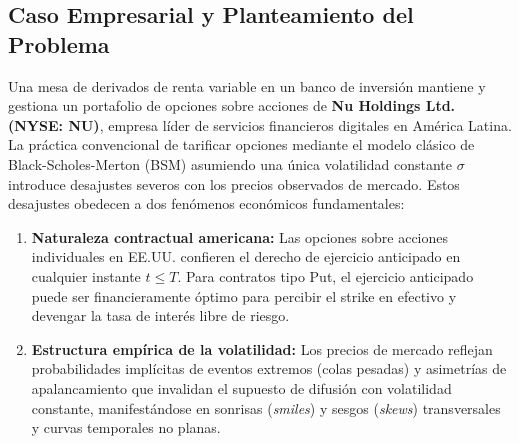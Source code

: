 \documentclass[11pt,a4paper]{article}
\begin{document}
\subsection{Caso Empresarial y Planteamiento del Problema}
Una mesa de derivados de renta variable en un banco de inversión mantiene y gestiona un portafolio de opciones sobre acciones de \textbf{Nu Holdings Ltd. (NYSE: NU)}, empresa líder de servicios financieros digitales en América Latina. La práctica convencional de tarificar opciones mediante el modelo clásico de Black-Scholes-Merton (BSM) asumiendo una única volatilidad constante $\sigma$ introduce desajustes severos con los precios observados de mercado. Estos desajustes obedecen a dos fenómenos económicos fundamentales:
\begin{enumerate}
    \item \textbf{Naturaleza contractual americana:} Las opciones sobre acciones individuales en EE.UU. confieren el derecho de ejercicio anticipado en cualquier instante $t \le T$. Para contratos tipo Put, el ejercicio anticipado puede ser financieramente óptimo para percibir el strike en efectivo y devengar la tasa de interés libre de riesgo.
    \item \textbf{Estructura empírica de la volatilidad:} Los precios de mercado reflejan probabilidades implícitas de eventos extremos (colas pesadas) y asimetrías de apalancamiento que invalidan el supuesto de difusión con volatilidad constante, manifestándose en sonrisas (\textit{smiles}) y sesgos (\textit{skews}) transversales y curvas temporales no planas.
\end{enumerate}
\end{document}

